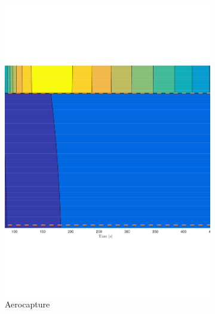 \begin{figure}
	\centering
	\begin{subfigure}[b]{0.45\textwidth}
		\includegraphics[width=\textwidth]{./Figure/Thermal/Thermal_contour_capture}
		\caption{Aerocapture}
		\label{fig:thermoaero}
	\end{subfigure}
	~ %
	\begin{subfigure}[b]{0.45\textwidth}

\end{subfigure}
\end{figure}
